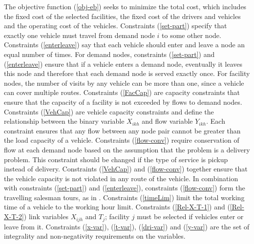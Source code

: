 The objective function (\ref{obj-eb}) seeks to minimize the total cost, which  
includes the fixed cost of the selected facilities, the fixed cost of the 
drivers and vehicles and the operating cost of the vehicles. Constraints 
(\ref{set-part}) specify that exactly one vehicle must travel from demand node $i$
to some other node. Constraints (\ref{enterleave}) say that each vehicle should enter 
and leave a node an equal number of times. For demand nodes, constraints 
(\ref{set-part}) and (\ref{enterleave}) ensure that if a vehicle enters a 
demand node, eventually it leaves this node and therefore that each demand 
node is served exactly once. For facility nodes, the number of visits by any 
vehicle can be more than one, since a vehicle can cover multiple routes. 
Constraints (\ref{FacCap}) are capacity constraints that ensure that the 
capacity of a facility is not exceeded by flows to demand nodes. 
Constraints (\ref{VehCap}) are vehicle capacity constraints and define the 
relationship between the binary variable $X_{ikh}$ and flow variable 
$Y_{ikh}$. Each constraint ensures that any flow between any node pair 
cannot be greater than the load capacity of a vehicle. Constraints (\ref{flow-conv})
require conservation of flow at each demand node based on the assumption that the 
problem is a delivery problem. This constraint should be changed if the type of
service is pickup instead of delivery. Constraints (\ref{VehCap}) and (\ref{flow-conv}) 
together ensure that the vehicle capacity is not violated in any route of the vehicle.
In combination with constraints (\ref{set-part}) and (\ref{enterleave}), 
constraints (\ref{flow-conv}) form the travelling salesman tours, as in 
\citet {Nambiar}.  Constraints (\ref{timeLim}) limit the 
total working time of a vehicle to the working hour limit. 
Constraints (\ref{Rel-X-T-1}) and (\ref{Rel-X-T-2}) link variables $X_{ijh}$ 
and $T_{j}$; facility $j$ must be selected if vehicles enter or leave
from it. Constraints (\ref{x-var}), (\ref{t-var}), (\ref{dri-var}) and (\ref{y-var}) 
are the set of integrality and non-negativity requirements on the variables.    


